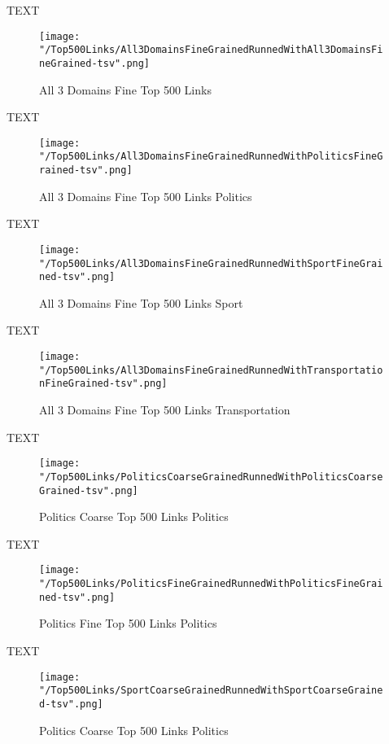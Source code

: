 \documentclass[thesis=M,english]{FITthesis}[2012/10/20]
\begin{document}
		TEXT	

	\begin{figure}\centering
		\texttt{[image: "/Top500Links/All3DomainsFineGrainedRunnedWithAll3DomainsFineGrained-tsv".png]}
		\caption{All 3 Domains Fine Top 500 Links }\label{}	
	\end{figure}
	
	TEXT

	\begin{figure}\centering
		\texttt{[image: "/Top500Links/All3DomainsFineGrainedRunnedWithPoliticsFineGrained-tsv".png]}
		\caption{All 3 Domains Fine Top 500 Links Politics}\label{}
	\end{figure}	

	TEXT	

	\begin{figure}\centering
		\texttt{[image: "/Top500Links/All3DomainsFineGrainedRunnedWithSportFineGrained-tsv".png]}
		\caption{All 3 Domains Fine Top 500 Links Sport}\label{}
	\end{figure}
	
		TEXT	

	\begin{figure}\centering
		\texttt{[image: "/Top500Links/All3DomainsFineGrainedRunnedWithTransportationFineGrained-tsv".png]}
		\caption{All 3 Domains Fine Top 500 Links Transportation}\label{}	
	\end{figure}
	
	TEXT

	\begin{figure}\centering
		\texttt{[image: "/Top500Links/PoliticsCoarseGrainedRunnedWithPoliticsCoarseGrained-tsv".png]}
		\caption{Politics Coarse Top 500 Links Politics}\label{}
	\end{figure}	

	TEXT	

	\begin{figure}\centering
		\texttt{[image: "/Top500Links/PoliticsFineGrainedRunnedWithPoliticsFineGrained-tsv".png]}
		\caption{Politics Fine Top 500 Links Politics}\label{}
	\end{figure}

	
	TEXT

	\begin{figure}\centering
		\texttt{[image: "/Top500Links/SportCoarseGrainedRunnedWithSportCoarseGrained-tsv".png]}
		\caption{Politics Coarse Top 500 Links Politics}\label{}
	\end{figure}		
	
\end{document}
